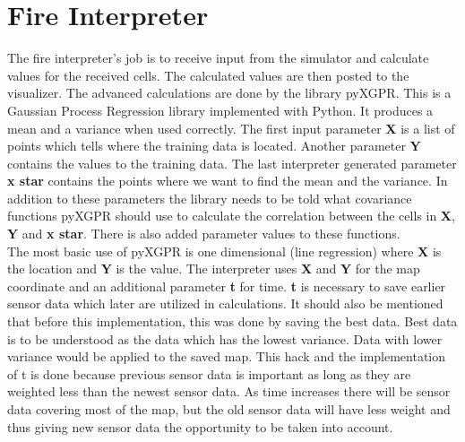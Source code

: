 \section{Fire Interpreter}

The fire interpreter's job is to receive input from the simulator and 
calculate values for the received cells. The calculated values are then posted to the visualizer. The advanced calculations are done by the library pyXGPR. This is a Gaussian Process Regression library implemented with Python. It produces a mean and a variance when used correctly. The first input parameter \textbf{X} is a list of points which tells where the training data is located. Another parameter \textbf{Y} contains the values to the training data. The last interpreter generated parameter \textbf{x star} contains the points where we want to find the mean and the variance. In addition to these parameters the library needs to be told what covariance functions pyXGPR should use to calculate the correlation between the cells in \textbf{X}, \textbf{Y} and \textbf{x star}. There is also added parameter values to these functions.
\\
The most basic use of pyXGPR is one dimensional (line regression) where \textbf{X} is the location and \textbf{Y} is the value. The interpreter uses \textbf{X} and \textbf{Y} for the map coordinate and an additional parameter \textbf{t} for time. \textbf{t} is necessary to save earlier sensor data which later are utilized in calculations. It should also be mentioned that before this implementation, this was done by saving the best data. Best data is to be understood as the data which has the lowest variance. Data with lower variance would be applied to the saved map. This hack and the implementation of t is done because previous sensor data is important as long as they are weighted less than the newest sensor data. As time increases there will be sensor data covering most of the map, but the old sensor data will have less weight and thus giving new sensor data the opportunity to be taken into account.